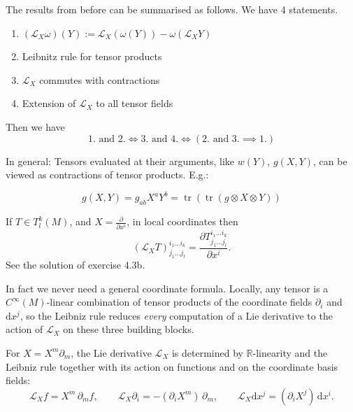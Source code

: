 \begin{colremark}
\label{rem:lie_derivative_extension_tensor_fields}
The results from before can be summarised as follows. We have 4 statements.
\begin{enumerate}[itemsep=0pt, topsep=0pt]
    \item $(\mathcal{L}_X \omega)(Y) := \mathcal{L}_X(\omega(Y)) - \omega(\mathcal{L}_X Y)$
    \item Leibnitz rule for tensor products
    \item $\mathcal{L}_X$ commutes with contractions
    \item Extension of $\mathcal{L}_X$ to all tensor fields\\
\end{enumerate}

Then we have
$$
1.\text{ and } 2.
\iff
3.\text{ and } 4.
\iff
(2.\text{ and } 3. \implies 1.)
$$
\end{colremark}


\begin{colremark}
In general: Tensors evaluated at their arguments, like $w(Y)$, $g(X,Y)$, can be viewed as contractions of tensor products. E.g.:

$$
g(X,Y) = g_{ab} X^a Y^b = \operatorname{tr}(\operatorname{tr}(g \otimes X \otimes Y))
$$
\end{colremark}


\begin{colremark}
\label{rem:lie_derivative_tensor_coordinates}
If $T \in T^k_l(M)$, and $X = \frac{\partial}{\partial x^i}$, in local coordinates then $$(\mathcal{L}_X T)^{i_1 \ldots i_k}_{j_1 \ldots j_l} = \frac{\partial T^{i_1 \ldots i_k}_{j_1 \ldots j_l}}{\partial x^i}.$$
See the solution of exercise 4.3b.
\end{colremark}

In fact we never need a general coordinate formula. Locally, any tensor is a $C^\infty(M)$-linear combination of tensor products of the coordinate fields $\partial_i$ and $\mathrm{d}x^j$, so the Leibniz rule reduces \emph{every} computation of a Lie derivative to the action of $\mathcal{L}_X$ on these three building blocks.

For $X = X^m \partial_m$, the Lie derivative $\mathcal{L}_X$ is determined by $\mathbb{R}$-linearity and the Leibniz rule together with its action on functions and on the coordinate basis fields:
\begin{equation}
\label{eq:lie_derivative_recipe}
\mathcal{L}_X f = X^m\,\partial_m f, \qquad
\mathcal{L}_X \partial_i = -(\partial_i X^m)\,\partial_m, \qquad
\mathcal{L}_X \mathrm{d}x^j = (\partial_i X^j)\,\mathrm{d}x^i .
\end{equation}

